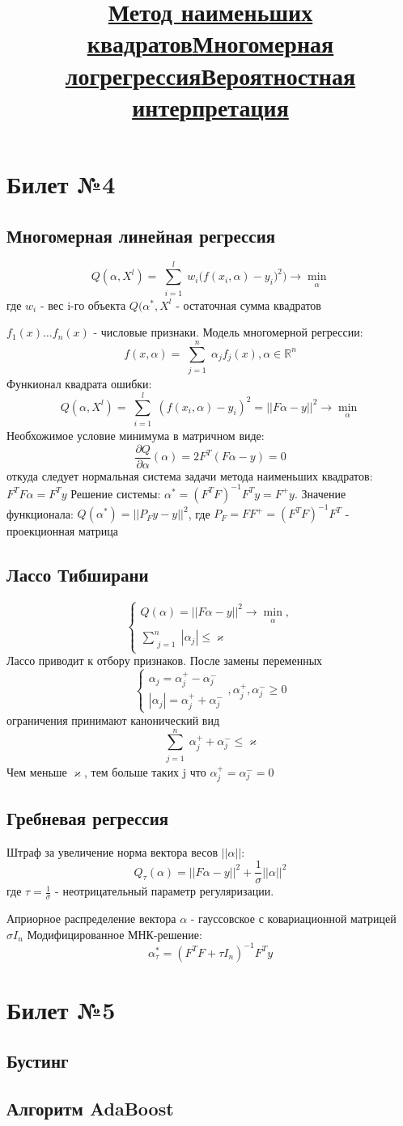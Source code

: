 \documentclass[a4paper]{article}
\theoremstyle{plain}
\theoremstyle{remark}
\theoremstyle{definition}
\newcommand{\setR}{\mathbb{R}}
\renewcommand{\leq}{\leqslant}
\renewcommand{\geq}{\geqslant}
\newcommand{\bigtitle}[1]{\title{\textbf{\underline{#1}}}}
\begin{document}
\section{Билет №4}
\subsection{Многомерная линейная регрессия}
\bigtitle{Метод наименьших квадратов}
$$ Q(\alpha, X^l) = \sum_{\substack{i=1}}^l w_i \Big( f(x_i, \alpha) - y_i)^2 \Big) \rightarrow \min_{\substack{\alpha}} $$
где $w_i$ - вес i-го объекта
$Q(\alpha^*, X^l$ - остаточная сумма квадратов
\bigtitle{Многомерная логрегрессия}
$f_1(x) \ldots f_n(x)$ - числовые признаки. Модель многомерной регрессии:
$$f(x, \alpha) = \sum_{\substack{j=1}}^n \alpha_j f_j(x), \alpha \in \setR^n$$
Функионал квадрата ошибки:
$$ Q(\alpha, X^l) = \sum_{\substack{i=1}}^l (f(x_i, \alpha) - y_i)^2 = ||F\alpha - y ||^2 \rightarrow \min_{\substack{\alpha}} $$
Необхожимое условие минимума в матричном виде: $$ \frac{\partial Q}{\partial \alpha}(\alpha) = 2F^T(F\alpha-y) = 0 $$
откуда следует нормальная система задачи метода наименьших квадратов: $F^TF\alpha = F^Ty$
Решение системы: $\alpha^* = (F^TF)^{-1}F^Ty = F^{+}y$. Значение функционала: $Q(\alpha^*) = ||P_Fy -y ||^2$, где $P_F = FF^+ = (F^TF)^{-1}F^T$ - проекционная матрица
\subsection{Лассо Тибширани}
$$
\begin{cases}
	Q(\alpha) = ||F\alpha - y||^2 \rightarrow \min_{\substack{\alpha}}, \\
	\sum_{\substack{j=1}}^n|\alpha_j| \leq \varkappa
\end{cases}
$$
Лассо приводит к отбору признаков. После замены переменных
$$ \begin{cases}
	\alpha_j = \alpha_j^+ - \alpha_j^- \\
	|\alpha_j| = \alpha_j^+ + \alpha_j^- 
\end{cases}, \alpha_j^+, \alpha_j^- \geq 0 $$
ограничения принимают канонический вид $$ \sum_{\substack{j=1}}^n \alpha_j^+ + \alpha_j^- \leq \varkappa $$
Чем меньше $\varkappa$, тем больше таких j что $\alpha_j^+ = \alpha_j^- =0$

\subsection{Гребневая регрессия}
Штраф за увеличение норма вектора весов $||\alpha||$:
$$ Q_\tau(\alpha) = ||F\alpha - y||^2 + \frac{1}{\sigma} ||\alpha||^2$$
где $\tau = \frac{1}{\sigma}$ - неотрицательный параметр регуляризации.
\bigtitle{Вероятностная интерпретация}
Априорное распределение вектора $\alpha$ - гауссовское с ковариационной матрицей $\sigma I_n$
Модифицированное МНК-решение: $$ \alpha_\tau^* = (F^{T}F + \tau I_n)^{-1}F^{T}y $$


\section{Билет №5}
\subsection{Бустинг}
\subsection{Алгоритм AdaBoost}
\end{document}
